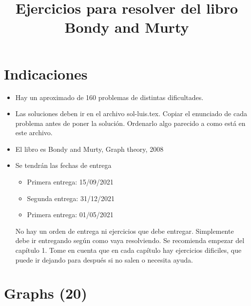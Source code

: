 \documentclass[12pt]{article}
\begin{document}
 


 
\title{Ejercicios para resolver del libro Bondy and Murty}
\maketitle

\tableofcontents

\newpage

\section{Indicaciones}

\begin{itemize}

\item Hay un aproximado de 160 problemas de distintas dificultades.

\item Las soluciones deben ir en el archivo sol-luis.tex. Copiar el enunciado de cada problema antes de poner la solución.
Ordenarlo algo parecido a como está en este archivo.

\item El libro es Bondy and Murty, Graph theory, 2008

\item Se tendrán las fechas de entrega

\begin{itemize}
\item Primera entrega: 15/09/2021
\item Segunda entrega: 31/12/2021
\item Primera entrega: 01/05/2021
\end{itemize}

No hay un orden de entrega ni ejercicios que debe entregar. Simplemente debe ir entregando según como vaya resolviendo. Se recomienda empezar del capítulo 1. Tome en cuenta que en cada capítulo hay ejercicios dificiles, que puede ir dejando para después si no salen o necesita ayuda.

\end{itemize}

\newpage

\section{Graphs (20)}
\end{document}
